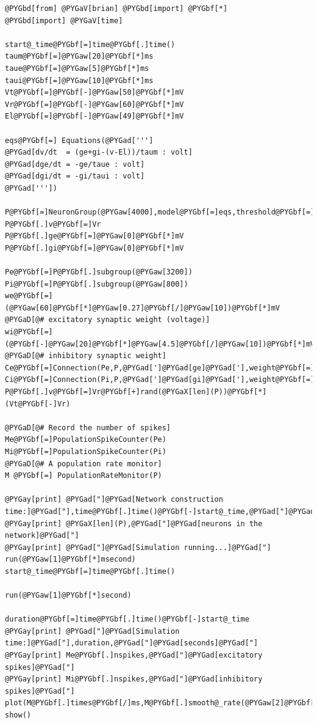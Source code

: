 \documentclass[letterpaper,10pt,english]{manual}
\begin{document}
\begin{Verbatim}[commandchars=@\[\]]
@PYGbd[from] @PYGaV[brian] @PYGbd[import] @PYGbf[*]
@PYGbd[import] @PYGaV[time]

start@_time@PYGbf[=]time@PYGbf[.]time()
taum@PYGbf[=]@PYGaw[20]@PYGbf[*]ms
taue@PYGbf[=]@PYGaw[5]@PYGbf[*]ms
taui@PYGbf[=]@PYGaw[10]@PYGbf[*]ms
Vt@PYGbf[=]@PYGbf[-]@PYGaw[50]@PYGbf[*]mV
Vr@PYGbf[=]@PYGbf[-]@PYGaw[60]@PYGbf[*]mV
El@PYGbf[=]@PYGbf[-]@PYGaw[49]@PYGbf[*]mV

eqs@PYGbf[=] Equations(@PYGad[''']
@PYGad[dv/dt  = (ge+gi-(v-El))/taum : volt]
@PYGad[dge/dt = -ge/taue : volt]
@PYGad[dgi/dt = -gi/taui : volt]
@PYGad['''])

P@PYGbf[=]NeuronGroup(@PYGaw[4000],model@PYGbf[=]eqs,threshold@PYGbf[=]Vt,reset@PYGbf[=]Vr,refractory@PYGbf[=]@PYGaw[5]@PYGbf[*]ms)
P@PYGbf[.]v@PYGbf[=]Vr
P@PYGbf[.]ge@PYGbf[=]@PYGaw[0]@PYGbf[*]mV
P@PYGbf[.]gi@PYGbf[=]@PYGaw[0]@PYGbf[*]mV

Pe@PYGbf[=]P@PYGbf[.]subgroup(@PYGaw[3200])
Pi@PYGbf[=]P@PYGbf[.]subgroup(@PYGaw[800])
we@PYGbf[=](@PYGaw[60]@PYGbf[*]@PYGaw[0.27]@PYGbf[/]@PYGaw[10])@PYGbf[*]mV @PYGaD[@# excitatory synaptic weight (voltage)]
wi@PYGbf[=](@PYGbf[-]@PYGaw[20]@PYGbf[*]@PYGaw[4.5]@PYGbf[/]@PYGaw[10])@PYGbf[*]mV @PYGaD[@# inhibitory synaptic weight]
Ce@PYGbf[=]Connection(Pe,P,@PYGad[']@PYGad[ge]@PYGad['],weight@PYGbf[=]we,sparseness@PYGbf[=]@PYGaw[0.02])
Ci@PYGbf[=]Connection(Pi,P,@PYGad[']@PYGad[gi]@PYGad['],weight@PYGbf[=]wi,sparseness@PYGbf[=]@PYGaw[0.02])
P@PYGbf[.]v@PYGbf[=]Vr@PYGbf[+]rand(@PYGaX[len](P))@PYGbf[*](Vt@PYGbf[-]Vr)

@PYGaD[@# Record the number of spikes]
Me@PYGbf[=]PopulationSpikeCounter(Pe)
Mi@PYGbf[=]PopulationSpikeCounter(Pi)
@PYGaD[@# A population rate monitor]
M @PYGbf[=] PopulationRateMonitor(P)

@PYGay[print] @PYGad["]@PYGad[Network construction time:]@PYGad["],time@PYGbf[.]time()@PYGbf[-]start@_time,@PYGad["]@PYGad[seconds]@PYGad["]
@PYGay[print] @PYGaX[len](P),@PYGad["]@PYGad[neurons in the network]@PYGad["]
@PYGay[print] @PYGad["]@PYGad[Simulation running...]@PYGad["]
run(@PYGaw[1]@PYGbf[*]msecond)
start@_time@PYGbf[=]time@PYGbf[.]time()

run(@PYGaw[1]@PYGbf[*]second)

duration@PYGbf[=]time@PYGbf[.]time()@PYGbf[-]start@_time
@PYGay[print] @PYGad["]@PYGad[Simulation time:]@PYGad["],duration,@PYGad["]@PYGad[seconds]@PYGad["]
@PYGay[print] Me@PYGbf[.]nspikes,@PYGad["]@PYGad[excitatory spikes]@PYGad["]
@PYGay[print] Mi@PYGbf[.]nspikes,@PYGad["]@PYGad[inhibitory spikes]@PYGad["]
plot(M@PYGbf[.]times@PYGbf[/]ms,M@PYGbf[.]smooth@_rate(@PYGaw[2]@PYGbf[*]ms,@PYGad[']@PYGad[gaussian]@PYGad[']))
show()
\end{Verbatim}
\end{document}
